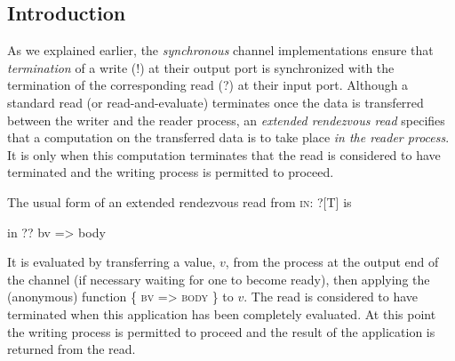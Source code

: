\documentclass[12pt]{IOS-Book-Article-CPA-2017}
\begin{document}
\subsection{Introduction}
As we explained earlier, the \textit{synchronous} channel implementations 
ensure that \textit{termination} of a write (!) at their output port is
synchronized with the termination of the corresponding read (?) at
their input port. 
%
Although a standard read (or read-and-evaluate) terminates once the data is transferred
between the writer and the reader process, an \textit{extended
rendezvous read} specifies that a computation on the transferred data is to take place \textit{in the
reader process}. It is only when this computation terminates
that the read is considered to have terminated and the writing process
is permitted to proceed.

The usual form of an extended rendezvous read from \textsc{in: ?[T]} is
\begin{code}
        in ?? { bv => body } 
\end{code}
It is evaluated by transferring a value, $v$, from the process at
the output end of the channel (if necessary waiting for one to
become ready), then applying the (anonymous) function \textsc{\{ bv => body \}}
to $v$. The read is considered to have terminated when
this application has been completely evaluated. At this point the writing process 
is permitted to proceed and the result of the application is returned from the read. 


\begin{comment}
In CSO the notation for an extended rendezvous read from \textsc{in: ?[T]} is
\textsc{in ? f}, where \textsc{f: T=>U} denotes function of type \textsc{T=>U}. 
The expression \textsc{in ? f} has type \textsc{U}, and it is evaluated by 
transferring a value, $v$, from the process at the output end of the
channel (if necessary waiting for one to become ready), then evaluating \textsc{f}($v$).
The read is considered to have terminated when the evaluation of \textsc{f}($v$)
is complete;  at which point the writing process proceeds.
It is more readable to express the function
anonymously than to name it; \textit{i.e.} to express the whole rendezvous in the form 
\textsc{in ? \{v => body\}} rather than in the form \textsc{\{def f(v)=body; in ? f\}}.
\end{comment}
\end{document}

